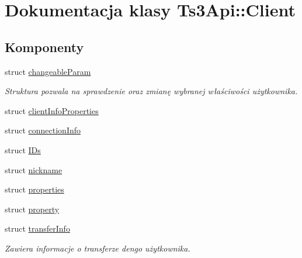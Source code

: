 \hypertarget{class_ts3_api_1_1_client}{}\section{Dokumentacja klasy Ts3\+Api\+:\+:Client}
\label{class_ts3_api_1_1_client}
\subsection*{Komponenty}
\begin{DoxyCompactItemize}
\item 
struct \hyperlink{struct_ts3_api_1_1_client_1_1changeable_param}{changeable\+Param}
\begin{DoxyCompactList}\small\item\em Struktura pozwala na sprawdzenie oraz zmianę wybranej właściwości użytkownika. \end{DoxyCompactList}\item 
struct \hyperlink{struct_ts3_api_1_1_client_1_1client_info_properties}{client\+Info\+Properties}
\item 
struct \hyperlink{struct_ts3_api_1_1_client_1_1connection_info}{connection\+Info}
\item 
struct \hyperlink{struct_ts3_api_1_1_client_1_1_i_ds}{I\+Ds}
\item 
struct \hyperlink{struct_ts3_api_1_1_client_1_1nickname}{nickname}
\item 
struct \hyperlink{struct_ts3_api_1_1_client_1_1properties}{properties}
\item 
struct \hyperlink{struct_ts3_api_1_1_client_1_1property}{property}
\item 
struct \hyperlink{struct_ts3_api_1_1_client_1_1transfer_info}{transfer\+Info}
\begin{DoxyCompactList}\small\item\em Zawiera informacje o transferze dengo użytkownika. \end{DoxyCompactList}\end{DoxyCompactItemize}
